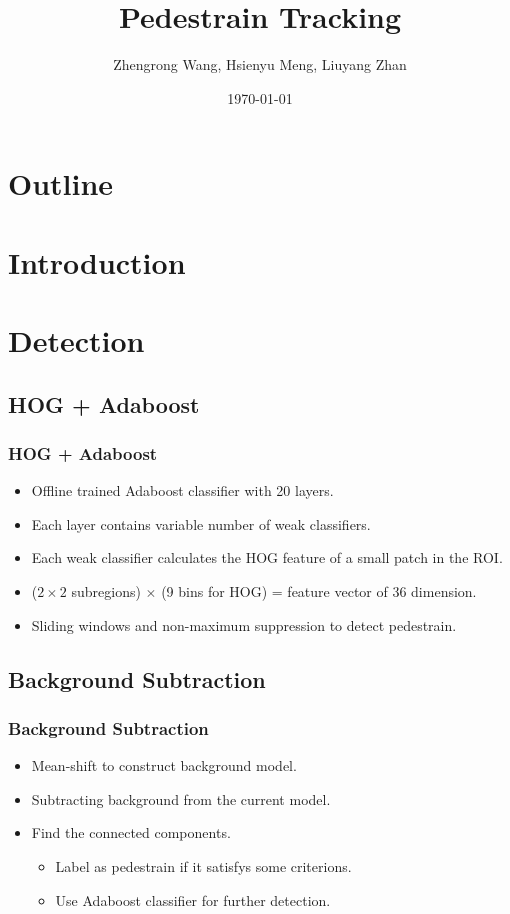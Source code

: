 \documentclass{beamer}
\title{Pedestrain Tracking}
\author{Zhengrong Wang, Hsienyu Meng, Liuyang Zhan}
\date{\today}
\begin{document}
\begin{frame}
\titlepage
\end{frame}

\section*{Outline}
\begin{frame}
\tableofcontents
\end{frame}

\section{Introduction}

\section{Detection}
\subsection{HOG + Adaboost}
\begin{frame}
\frametitle{HOG + Adaboost}
\begin{itemize}
\item Offline trained Adaboost classifier with 20 layers.
\item Each layer contains variable number of weak classifiers.
\item Each weak classifier calculates the HOG feature of a small patch in the ROI.
\item ($2\times2$ subregions) $\times$ (9 bins for HOG) = feature vector of 36 dimension.
\item Sliding windows and non-maximum suppression to detect pedestrain.
\end{itemize}
\end{frame}

\subsection{Background Subtraction}
\begin{frame}
\frametitle{Background Subtraction}
\begin{itemize}
\item Mean-shift to construct background model.
\item Subtracting background from the current model.
\item Find the connected components.
\begin{itemize}
	\item Label as pedestrain if it satisfys some criterions.
	\item Use Adaboost classifier for further detection.

\end{itemize}
\end{itemize}
\end{frame}
\end{document}
